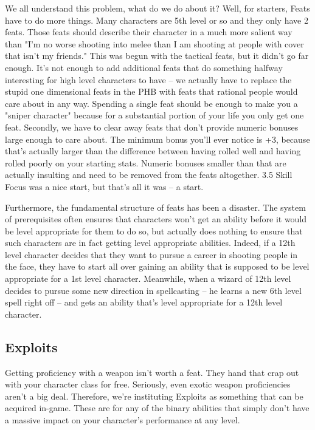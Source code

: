 We all understand this problem, what do we do about it? Well, for starters, Feats have to do more things. Many characters are 5th level or so and they only have 2 feats. Those feats should describe their character in a much more salient way than "I'm no worse shooting into melee than I am shooting at people with cover that isn't my friends." This was begun with the tactical feats, but it didn't go far enough. It's not enough to add additional feats that do something halfway interesting for high level characters to have -- we actually have to replace the stupid one dimensional feats in the PHB with feats that rational people would care about in any way. Spending a single feat should be enough to make you a "sniper character" because for a substantial portion of your life you only get one feat. Secondly, we have to clear away feats that don't provide numeric bonuses large enough to care about. The minimum bonus you'll ever notice is +3, because that's actually larger than the difference between having rolled well and having rolled poorly on your starting stats. Numeric bonuses smaller than that are actually insulting and need to be removed from the feats altogether. 3.5 Skill Focus was a nice start, but that's all it was -- a start.

Furthermore, the fundamental structure of feats has been a disaster. The system of prerequisites often ensures that characters won't get an ability before it would be level appropriate for them to do so, but actually does nothing to ensure that such characters are in fact getting level appropriate abilities. Indeed, if a 12th level character decides that they want to pursue a career in shooting people in the face, they have to start all over gaining an ability that is supposed to be level appropriate for a 1st level character. Meanwhile, when a wizard of 12th level decides to pursue some new direction in spellcasting -- he learns a new 6th level spell right off -- and gets an ability that's level appropriate for a 12th level character.

\subsection{Exploits}
Getting proficiency with a weapon isn't worth a feat. They hand that crap out with your character class for free. Seriously, even exotic weapon proficiencies aren't a big deal. Therefore, we're instituting Exploits as something that can be acquired in-game. These are for any of the binary abilities that simply don't have a massive impact on your character's performance at any level.

